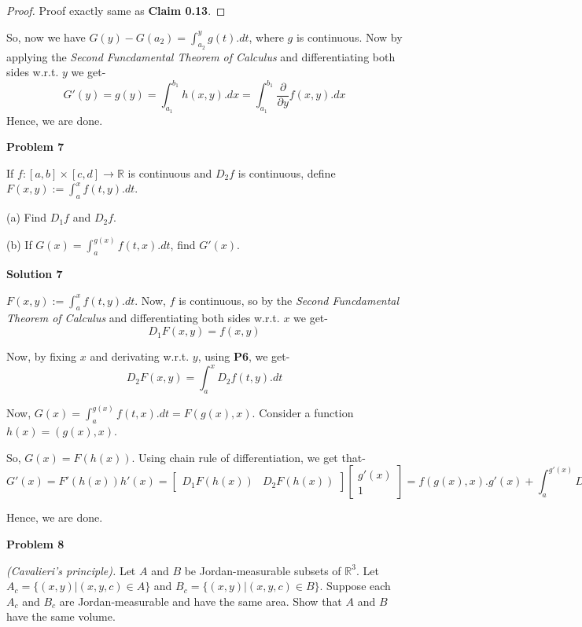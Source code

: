 \documentclass[12pt,a4paper]{article}
\theoremstyle{definition}
\begin{document}
\begin{flushleft}
\begin{proof}
	Proof exactly same as {\bf Claim 0.13}.
\end{proof}

So, now we have $G(y) - G(a_2) = \int_{a_2}^{y} g(t).dt$, where $g$ is continuous. Now by applying the {\it Second Funcdamental Theorem of Calculus} and differentiating both sides w.r.t. $y$ we get-
$$G'(y) = g(y) = \int_{a_1}^{b_1} h(x,y).dx = \int_{a_1}^{b_1} \frac{\partial}{\partial y} f(x,y) .dx$$
Hence, we are done.

\newpage

{\bf  Problem 7}

If $f:[a,b] \times [c,d] \to \mathbb{R}$ is continuous and $D_2 f$ is continuous, define $F(x,y) := \int_{a}^{x} f(t,y).dt$.

(a) Find $D_1 f$ and $D_2 f$.

(b) If $G(x) = \int_{a}^{g(x)} f(t,x).dt$, find $G'(x)$.

\bigskip

{\bf Solution 7}

\medskip

$F(x,y) := \int_{a}^{x} f(t,y).dt $. Now, $f$ is continuous, so by the {\it Second Funcdamental Theorem of Calculus} and differentiating both sides w.r.t. $x$ we get-
$$D_1 F(x,y) = f(x,y)$$

Now, by fixing $x$ and derivating w.r.t. $y$, using {\bf P6}, we get-
$$D_2 F(x,y) = \int_{a}^{x} D_2 f(t,y).dt$$

Now, $G(x) = \int_{a}^{g(x)} f(t,x).dt = F(g(x),x)$. Consider a function $h(x) = (g(x),x)$.

So, $G(x) = F(h(x))$. Using chain rule of differentiation, we get that-
$$G'(x) = F'(h(x))h'(x) = 
\begin{bmatrix}
	D_1 F(h(x)) & D_2 F(h(x))
\end{bmatrix}
\begin{bmatrix}
	g'(x) \\
	1
\end{bmatrix}
= f(g(x),x).g'(x) + \int_{a}^{g'(x)} D_2 f(t,x).dt
$$

Hence, we are done.

\newpage

{\bf  Problem 8}

{\it (Cavalieri's principle).} Let $A$ and $B$ be Jordan-measurable subsets of $\mathbb{R}^3$. Let $A_c = \{(x,y) | (x,y,c) \in A\}$ and $B_c = \{(x,y) | (x,y,c) \in B\}$. Suppose each $A_c$ and $B_c$ are Jordan-measurable and have the same area. Show that $A$ and $B$ have the same volume.


\end{flushleft}
\end{document}
